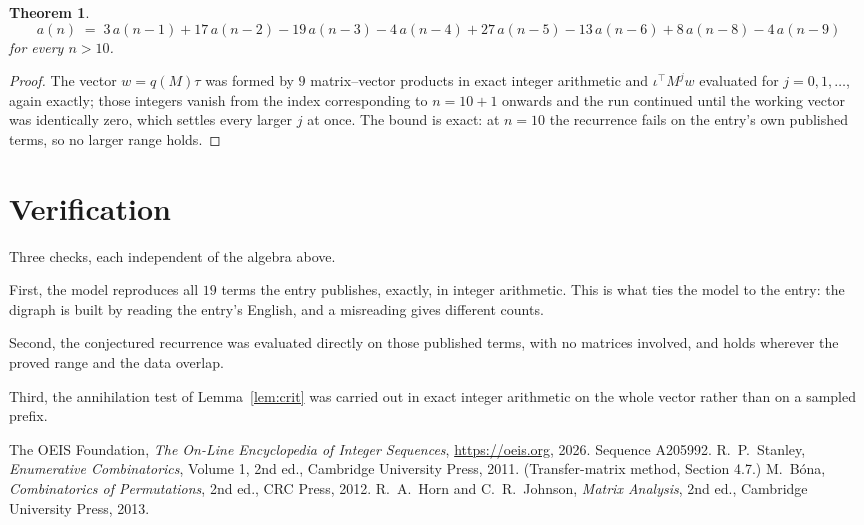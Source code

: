 \documentclass[11pt,a4paper]{article}
\theoremstyle{plain}
\newtheorem{theorem}{Theorem}
\theoremstyle{definition}
\begin{document}
\begin{theorem}
\[
a(n)\;=\;3\,a(n-1) + 17\,a(n-2) - 19\,a(n-3) - 4\,a(n-4) + 27\,a(n-5) - 13\,a(n-6) + 8\,a(n-8) - 4\,a(n-9)
\]
for every $n>10$.
\end{theorem}

\begin{proof}
The vector $w=q(M)\tau$ was formed by $9$ matrix--vector products in exact integer
arithmetic and $\iota^{\!\top}M^{j}w$ evaluated for $j=0,1,\dots$, again exactly; those
integers vanish from the index corresponding to $n=10+1$ onwards and the run continued
until the working vector was identically zero, which settles every larger $j$ at once. The bound is exact: at $n=10$ the recurrence fails on the entry's own published terms, so no larger range holds.
\end{proof}

\section{Verification}

Three checks, each independent of the algebra above.

First, the model reproduces all $19$ terms the entry publishes, exactly, in integer
arithmetic. This is what ties the model to the entry: the digraph is built by reading the
entry's English, and a misreading gives different counts.

Second, the conjectured recurrence was evaluated directly on those published terms, with no
matrices involved, and holds wherever the proved range and the data overlap.

Third, the annihilation test of Lemma~\ref{lem:crit} was carried out in exact integer
arithmetic on the whole vector rather than on a sampled prefix.

\begin{thebibliography}{9}
 The OEIS Foundation, \emph{The On-Line Encyclopedia of Integer
Sequences}, \url{https://oeis.org}, 2026. Sequence A205992.
 R.~P.~Stanley, \emph{Enumerative Combinatorics}, Volume 1, 2nd ed.,
Cambridge University Press, 2011. (Transfer-matrix method, Section 4.7.)
 M.~B\'ona, \emph{Combinatorics of Permutations}, 2nd ed., CRC
Press, 2012.
 R.~A.~Horn and C.~R.~Johnson, \emph{Matrix Analysis}, 2nd ed., Cambridge
University Press, 2013.
\end{thebibliography}
\end{document}
